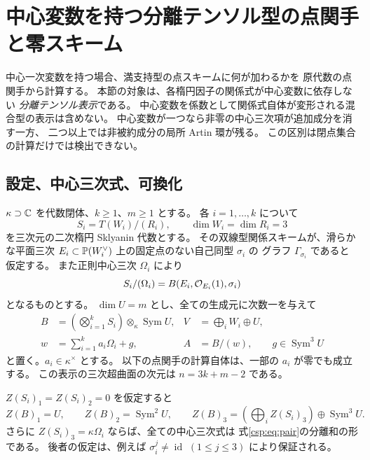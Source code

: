 \section{中心変数を持つ分離テンソル型の点関手と零スキーム}
\label{csp:sec:central-split}

中心一次変数を持つ場合、満支持型の点スキームに何が加わるかを
原代数の点関手から計算する。
本節の対象は、各楕円因子の関係式が中心変数に依存しない
\emph{分離テンソル表示}である。
中心変数を係数として関係式自体が変形される混合型の表示は含めない。
中心変数が一つなら非零の中心三次項が追加成分を消す一方、
二つ以上では非被約成分の局所 Artin 環が残る。
この区別は閉点集合の計算だけでは検出できない。

\subsection{設定、中心三次式、可換化}

$\kappa\supset\mathbb C$ を代数閉体、$k\ge1$、$m\ge1$ とする。
各 $i=1,\ldots,k$ について
\[
 S_i=T(W_i)/(R_i),\qquad \dim W_i=\dim R_i=3
\]
を三次元の二次楕円 Sklyanin 代数とする。
その双線型関係スキームが、滑らかな平面三次
$E_i\subset\mathbb P(W_i^\vee)$ 上の固定点のない自己同型 $\sigma_i$ の
グラフ $\Gamma_{\sigma_i}$ であると仮定する。
また正則中心三次 $\Omega_i$ により
\[
 S_i/(\Omega_i)=B(E_i,\mathcal O_{E_i}(1),\sigma_i)
\]
となるものとする。
$\dim U=m$ とし、全ての生成元に次数一を与えて
\begin{equation}\label{csp:eq:pair}
 \begin{aligned}
 B&=\left(\bigotimes_{i=1}^kS_i\right)\otimes_\kappa\operatorname{Sym}U,
 &V&=\bigoplus_iW_i\oplus U,\\
 w&=\sum_{i=1}^k a_i\Omega_i+g,
 &A&=B/(w),\qquad g\in\operatorname{Sym}^3U
 \end{aligned}
\end{equation}
と置く。$a_i\in\kappa^\times$ とする。
以下の点関手の計算自体は、一部の $a_i$ が零でも成立する。
この表示の三次超曲面の次元は $n=3k+m-2$ である。

\begin{lemma}[分離表示の中心三次式]
\label{csp:lem:center}
$Z(S_i)_1=Z(S_i)_2=0$ を仮定すると
\begin{equation}\label{csp:eq:centers}
 Z(B)_1=U,\qquad Z(B)_2=\operatorname{Sym}^2U,\qquad
 Z(B)_3=\left(\bigoplus_iZ(S_i)_3\right)
                  \oplus\operatorname{Sym}^3U.
\end{equation}
さらに $Z(S_i)_3=\kappa\Omega_i$ ならば、全ての中心三次式は
式\eqref{csp:eq:pair}の分離和の形である。
後者の仮定は、例えば $\sigma_i^j\ne\operatorname{id}$
$(1\le j\le3)$ により保証される。
\end{lemma}

